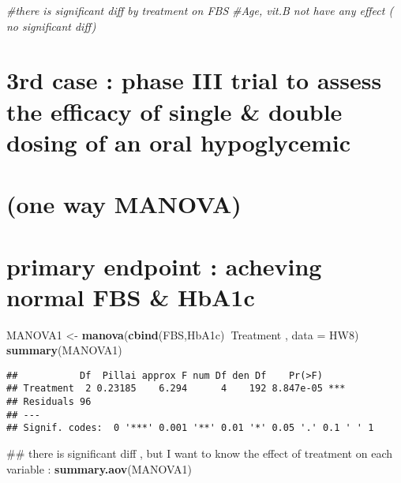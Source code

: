 \documentclass[]{article}
\newenvironment{Shaded}{\begin{snugshade}}{\end{snugshade}}
\newcommand{\KeywordTok}[1]{\textcolor[rgb]{0.13,0.29,0.53}{\textbf{#1}}}
\newcommand{\DataTypeTok}[1]{\textcolor[rgb]{0.13,0.29,0.53}{#1}}
\newcommand{\StringTok}[1]{\textcolor[rgb]{0.31,0.60,0.02}{#1}}
\newcommand{\CommentTok}[1]{\textcolor[rgb]{0.56,0.35,0.01}{\textit{#1}}}
\newcommand{\OperatorTok}[1]{\textcolor[rgb]{0.81,0.36,0.00}{\textbf{#1}}}
\newcommand{\NormalTok}[1]{#1}
\begin{document}
\begin{Shaded}
\begin{Highlighting}[]
\CommentTok{#there is significant diff by treatment on FBS  }
\CommentTok{#Age, vit.B  not  have  any effect ( no significant diff)}
\end{Highlighting}
\end{Shaded}

\section{3rd case : phase III trial to assess the efficacy of single \&
double dosing of an oral
hypoglycemic}\label{rd-case-phase-iii-trial-to-assess-the-efficacy-of-single-double-dosing-of-an-oral-hypoglycemic}

\section{(one way MANOVA)}\label{one-way-manova}

\section{primary endpoint : acheving normal FBS \&
HbA1c}\label{primary-endpoint-acheving-normal-fbs-hba1c}

\begin{Shaded}
\begin{Highlighting}[]
\NormalTok{MANOVA1 <-}\StringTok{ }\KeywordTok{manova}\NormalTok{(}\KeywordTok{cbind}\NormalTok{(FBS,HbA1c)}\OperatorTok{~}\NormalTok{Treatment , }\DataTypeTok{data =}\NormalTok{ HW8)}
\KeywordTok{summary}\NormalTok{(MANOVA1)}
\end{Highlighting}
\end{Shaded}

\begin{verbatim}
##           Df  Pillai approx F num Df den Df    Pr(>F)    
## Treatment  2 0.23185    6.294      4    192 8.847e-05 ***
## Residuals 96                                             
## ---
## Signif. codes:  0 '***' 0.001 '**' 0.01 '*' 0.05 '.' 0.1 ' ' 1
\end{verbatim}

\begin{Shaded}
\begin{Highlighting}[]
\NormalTok{## there is significant diff , but I want to know the effect of treatment on each variable :}
\KeywordTok{summary.aov}\NormalTok{(MANOVA1)}
\end{Highlighting}
\end{Shaded}
\end{document}
